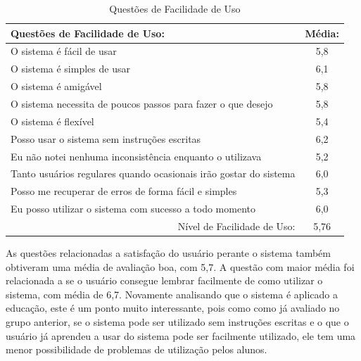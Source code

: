 \begin{table}[]
\centering
\caption{Questões de Facilidade de Uso}
\label{tab:use_utilidade}
\begin{tabular}{@{}|l|c|@{}}
\hline
Questões de Facilidade de Uso:                                                   & \multicolumn{1}{l|}{Média:} \\ \hline
O sistema é fácil de usar                                    & 5,8                         \\ \hline
O sistema é simples de usar                                  & 6,1                         \\ \hline
O sistema é amigável                                                         & 5,8                            \\ \hline
O sistema necessita de poucos passos para fazer o que desejo                   & 5,8                            \\ \hline
O sistema é flexível & 5,4                            \\ \hline
Posso usar o sistema sem instruções escritas                                & 6,2                            \\ \hline
Eu não notei nenhuma inconsistência enquanto o utilizava                       &5,2                             \\ \hline
Tanto usuários regulares quando ocasionais irão gostar do sistema                       &6,0                             \\ \hline
Posso me recuperar de erros de forma fácil e simples                       &5,3                             \\ \hline
Eu posso utilizar o sistema com sucesso a todo momento                       &6,0                             \\ \hline
\multicolumn{1}{|r|}{Nível de Facilidade de Uso:}                                & 5,76      \\ \hline
\end{tabular}
\end{table}

As questões relacionadas a satisfação do usuário perante o sistema também obtiveram uma média de avaliação boa, com 5,7. A questão com maior média foi relacionada a se o usuário consegue lembrar facilmente de como utilizar o sistema, com média de 6,7. Novamente analisando que o sistema é aplicado a educação, este é um ponto muito interessante, pois como como já avaliado no grupo anterior, se o sistema pode ser utilizado sem instruções escritas e o que o usuário já aprendeu a usar do sistema pode ser facilmente utilizado, ele tem uma menor possibilidade de problemas de utilização pelos alunos.

